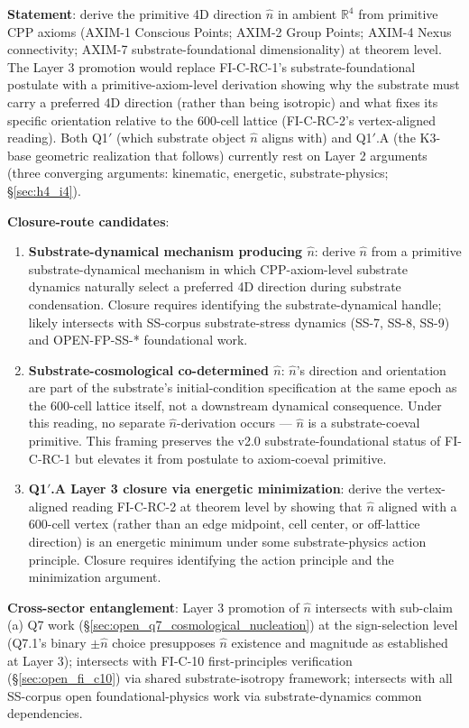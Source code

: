 \documentclass[11pt,letterpaper]{article}
\begin{document}
\textbf{Statement}: derive the primitive 4D direction $\hat{n}$ in ambient $\mathbb{R}^4$ from primitive CPP axioms (AXIM-1 Conscious Points; AXIM-2 Group Points; AXIM-4 Nexus connectivity; AXIM-7 substrate-foundational dimensionality) at theorem level. The Layer 3 promotion would replace FI-C-RC-1's substrate-foundational postulate with a primitive-axiom-level derivation showing why the substrate must carry a preferred 4D direction (rather than being isotropic) and what fixes its specific orientation relative to the 600-cell lattice (FI-C-RC-2's vertex-aligned reading). Both Q1$'$ (which substrate object $\hat{n}$ aligns with) and Q1$'$.A (the K3-base geometric realization that follows) currently rest on Layer 2 arguments (three converging arguments: kinematic, energetic, substrate-physics; \S\ref{sec:h4_i4}).

\textbf{Closure-route candidates}:

\begin{enumerate}\setlength\itemsep{0.3em}
    \item \textbf{Substrate-dynamical mechanism producing $\hat{n}$}: derive $\hat{n}$ from a primitive substrate-dynamical mechanism in which CPP-axiom-level substrate dynamics naturally select a preferred 4D direction during substrate condensation. Closure requires identifying the substrate-dynamical handle; likely intersects with SS-corpus substrate-stress dynamics (SS-7, SS-8, SS-9) and OPEN-FP-SS-* foundational work.
    \item \textbf{Substrate-cosmological co-determined $\hat{n}$}: $\hat{n}$'s direction and orientation are part of the substrate's initial-condition specification at the same epoch as the 600-cell lattice itself, not a downstream dynamical consequence. Under this reading, no separate $\hat{n}$-derivation occurs --- $\hat{n}$ is a substrate-coeval primitive. This framing preserves the v2.0 substrate-foundational status of FI-C-RC-1 but elevates it from postulate to axiom-coeval primitive.
    \item \textbf{Q1$'$.A Layer 3 closure via energetic minimization}: derive the vertex-aligned reading FI-C-RC-2 at theorem level by showing that $\hat{n}$ aligned with a 600-cell vertex (rather than an edge midpoint, cell center, or off-lattice direction) is an energetic minimum under some substrate-physics action principle. Closure requires identifying the action principle and the minimization argument.
\end{enumerate}

\textbf{Cross-sector entanglement}: Layer 3 promotion of $\hat{n}$ intersects with sub-claim (a) Q7 work (\S\ref{sec:open_q7_cosmological_nucleation}) at the sign-selection level (Q7.1's binary $\pm\hat{n}$ choice presupposes $\hat{n}$ existence and magnitude as established at Layer 3); intersects with FI-C-10 first-principles verification (\S\ref{sec:open_fi_c10}) via shared substrate-isotropy framework; intersects with all SS-corpus open foundational-physics work via substrate-dynamics common dependencies.
\end{document}
